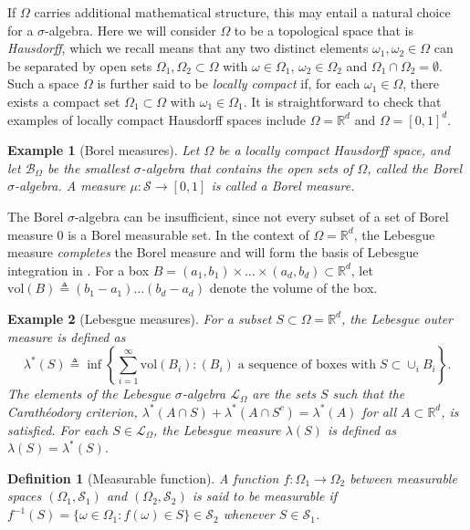 \documentclass[12pt,paper=letter]{scrreprt}
\newtheorem{definition}{Definition}[chapter]
\newtheorem{example}{Example}[chapter]
\def\defeq{\triangleq} %
\begin{document}
If $\Omega$ carries additional mathematical structure, this may entail a natural choice for a $\sigma$-algebra.
Here we will consider $\Omega$ to be a topological space that is \emph{Hausdorff}, which we recall means that any two distinct elements $\omega_1, \omega_2 \in \Omega$ can be separated by open sets $\Omega_1, \Omega_2 \subset \Omega$ with $\omega \in \Omega_1$, $\omega_2 \in \Omega_2$ and $\Omega_1 \cap \Omega_2 = \emptyset$.
Such a space $\Omega$ is further said to be \emph{locally compact} if, for each $\omega_1 \in \Omega$, there exists a compact set $\Omega_1 \subset \Omega$ with $\omega_1 \in \Omega_1$.
It is straightforward to check that examples of locally compact Hausdorff spaces include $\Omega = \mathbb{R}^d$ and $\Omega = [0,1]^d$.

\begin{example}[Borel measures]
Let $\Omega$ be a locally compact Hausdorff space, and let $\mathcal{B}_\Omega$ be the smallest $\sigma$-algebra that contains the open sets of $\Omega$, called the \emph{Borel} $\sigma$-algebra.
A measure $\mu : \mathcal{S} \rightarrow [0,1]$ is called a \emph{Borel} measure.
\end{example}

\noindent The Borel $\sigma$-algebra can be insufficient, since not every subset of a set of Borel measure 0 is a Borel measurable set.
In the context of $\Omega = \mathbb{R}^d$, the Lebesgue measure \emph{completes} the Borel measure and will form the basis of Lebesgue integration in .
For a box $B = (a_1,b_1) \times \dots \times (a_d,b_d) \subset \mathbb{R}^d$, let $\text{vol}(B) \defeq (b_1 - a_1) \dots (b_d - a_d)$ denote the volume of the box.

\begin{example}[Lebesgue measures]
\label{ex: lebesgue measure}
For a subset $S \subset \Omega = \mathbb{R}^d$, the \emph{Lebesgue outer measure} is defined as
$$
\lambda^*(S) \defeq \inf \left\{ \sum_{i=1}^\infty \text{vol}(B_i) : (B_i) \; \text{a sequence of boxes with} \; S \subset \cup_i B_i \right\}.
$$
The elements of the \emph{Lebesgue} $\sigma$-algebra $\mathcal{L}_\Omega$ are the sets $S$ such that the Carath\'{e}odory criterion, $\lambda^*(A \cap S) + \lambda^*(A \cap S^c) = \lambda^*(A)$ for all $A \subset \mathbb{R}^d$, is satisfied.
For each $S \in \mathcal{L}_\Omega$, the \emph{Lebesgue measure} $\lambda(S)$ is defined as $\lambda(S) = \lambda^*(S)$.
\end{example}

\begin{definition}[Measurable function]
A function $f : \Omega_1 \rightarrow \Omega_2$ between measurable spaces $(\Omega_1,\mathcal{S}_1)$ and $(\Omega_2,\mathcal{S}_2)$ is said to be \emph{measurable} if $f^{-1}(S) = \{\omega \in \Omega_1 : f(\omega) \in S\} \in \mathcal{S}_2$ whenever $S \in \mathcal{S}_1$.
\end{definition}
\end{document}
